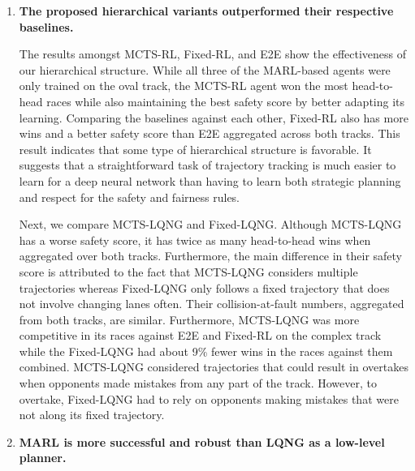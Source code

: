 \begin{enumerate}[wide, labelindent=0pt]
\item \textbf{The proposed hierarchical variants outperformed their respective baselines.} 

The results amongst MCTS-RL, Fixed-RL, and E2E show the effectiveness of our hierarchical structure. While all three of the MARL-based agents were only trained on the oval track, the MCTS-RL agent won the most head-to-head races while also maintaining the best safety score by better adapting its learning. Comparing the baselines against each other, Fixed-RL also has more wins and a better safety score than E2E aggregated across both tracks. This result indicates that some type of hierarchical structure is favorable. It suggests that a straightforward task of trajectory tracking is much easier to learn for a deep neural network than having to learn both strategic planning and respect for the safety and fairness rules. 

Next, we compare MCTS-LQNG and Fixed-LQNG. Although MCTS-LQNG has a worse safety score, it has twice as many head-to-head wins when aggregated over both tracks. Furthermore, the main difference in their safety score is attributed to the fact that MCTS-LQNG considers multiple trajectories whereas Fixed-LQNG only follows a fixed trajectory that does not involve changing lanes often. Their collision-at-fault numbers, aggregated from both tracks, are similar. Furthermore, MCTS-LQNG was more competitive in its races against E2E and Fixed-RL on the complex track while the Fixed-LQNG had about 9\% fewer wins in the races against them combined. MCTS-LQNG considered trajectories that could result in overtakes when opponents made mistakes from any part of the track. However, to overtake, Fixed-LQNG had to rely on opponents making mistakes that were not along its fixed trajectory.  

\item \textbf{MARL is more successful and robust than LQNG as a low-level planner.}  


\end{enumerate}
